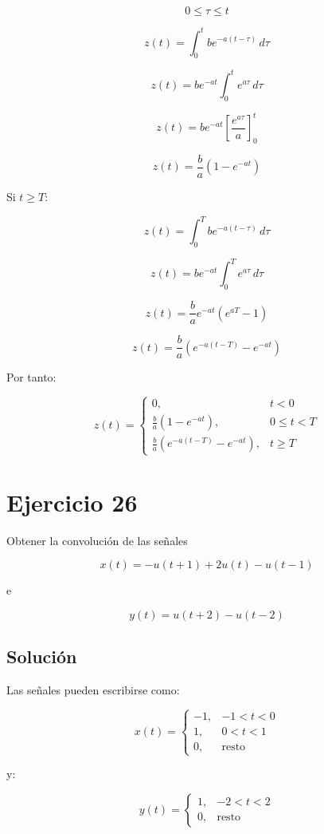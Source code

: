 \documentclass[fleqn]{article}
\begin{document}
	\[
	0\leq\tau\leq t
	\]

	\[
	z(t)
	=
	\int_0^t
	be^{-a(t-\tau)}\,d\tau
	\]

	\[
	z(t)
	=
	be^{-at}
	\int_0^t e^{a\tau}\,d\tau
	\]

	\[
	z(t)
	=
	be^{-at}
	\left[
	\frac{e^{a\tau}}{a}
	\right]_0^t
	\]

	\[
	z(t)
	=
	\frac{b}{a}
	\left(
	1-e^{-at}
	\right)
	\]

	Si $t\geq T$:

	\[
	z(t)
	=
	\int_0^T
	be^{-a(t-\tau)}\,d\tau
	\]

	\[
	z(t)
	=
	be^{-at}
	\int_0^T e^{a\tau}\,d\tau
	\]

	\[
	z(t)
	=
	\frac{b}{a}
	e^{-at}
	\left(
	e^{aT}-1
	\right)
	\]

	\[
	z(t)
	=
	\frac{b}{a}
	\left(
	e^{-a(t-T)}-e^{-at}
	\right)
	\]

	Por tanto:

	\[
	\boxed{
	z(t)=
	\begin{cases}
	0, & t<0 \\[2mm]
	\displaystyle
	\frac{b}{a}
	\left(
	1-e^{-at}
	\right),
	& 0\leq t<T \\[3mm]
	\displaystyle
	\frac{b}{a}
	\left(
	e^{-a(t-T)}-e^{-at}
	\right),
	& t\geq T
	\end{cases}
	}
	\]

\section{Ejercicio 26}
	Obtener la convolución de las señales

	\[
	x(t)=-u(t+1)+2u(t)-u(t-1)
	\]

	e

	\[
	y(t)=u(t+2)-u(t-2)
	\]

	\subsection{Solución}

	Las señales pueden escribirse como:

	\[
	x(t)=
	\begin{cases}
	-1, & -1<t<0 \\[1mm]
	1, & 0<t<1 \\[1mm]
	0, & \text{resto}
	\end{cases}
	\]

	y:

	\[
	y(t)=
	\begin{cases}
	1, & -2<t<2 \\[1mm]
	0, & \text{resto}
	\end{cases}
	\]
\end{document}
